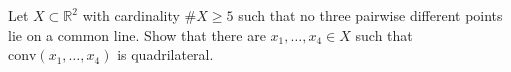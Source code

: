 Let $X\subset\mathbb{R}^{2}$ with cardinality $\#X\geq 5$ such that no three pairwise different points lie on a common line. Show that there are $x_{1},\dots,x_{4}\in X$ such that $\text{conv}(x_{1},\dots,x_{4})$ is quadrilateral.